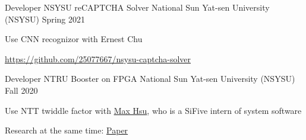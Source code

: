 \begin{cventries}
    \cventry
    {Developer}
    {NSYSU reCAPTCHA Solver}
    {National Sun Yat-sen University (NSYSU)} %
    {Spring 2021} %
    {
        \begin{cvitems} %
            \item {Use CNN recognizor with Ernest Chu}
            \item {\url{https://github.com/25077667/nsysu-captcha-solver}}
        \end{cvitems}
    }


    \cventry
    {Developer}
    {NTRU Booster on FPGA}
    {National Sun Yat-sen University (NSYSU)} %
    {Fall 2020} %
    {
        \begin{cvitems} %
            \item {Use NTT twiddle factor with \href{https://github.com/Max-Hsu}{Max Hsu}, who is a SiFive intern of system software}
            \item {Research at the same time: \href{http://dx.doi.org/10.6342/NTU202003012}{Paper}}
        \end{cvitems}
    }
\end{cventries}
